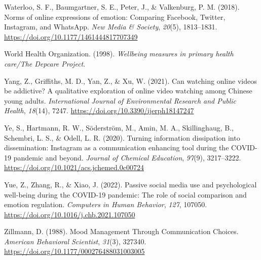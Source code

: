 \documentclass[
  man,mask]{apa7}
\newlength{\cslhangindent}
\newlength{\cslentryspacingunit} %
\newenvironment{CSLReferences}[2] %
 {%
  \setlength{\parindent}{0pt}
  \ifodd #1
  \let\oldpar\par
  \def\par{\hangindent=\cslhangindent\oldpar}
  \fi
  \setlength{\parskip}{#2\cslentryspacingunit}
 }%
 {}
\begin{document}
\begin{CSLReferences}{1}{0}
\leavevmode{}%
Waterloo, S. F., Baumgartner, S. E., Peter, J., \& Valkenburg, P. M. (2018). Norms of online expressions of emotion: {Comparing Facebook}, {Twitter}, {Instagram}, and {WhatsApp}. \emph{New Media \& Society}, \emph{20}(5), 1813--1831. \url{https://doi.org/10.1177/1461444817707349}

\leavevmode{}%
World Health Organization. (1998). \emph{Wellbeing measures in primary health care/{The Depcare Project}}.

\leavevmode{}%
Yang, Z., Griffiths, M. D., Yan, Z., \& Xu, W. (2021). Can watching online videos be addictive? {A} qualitative exploration of online video watching among {Chinese} young adults. \emph{International Journal of Environmental Research and Public Health}, \emph{18}(14), 7247. \url{https://doi.org/10.3390/ijerph18147247}

\leavevmode{}%
Ye, S., Hartmann, R. W., Söderström, M., Amin, M. A., Skillinghaug, B., Schembri, L. S., \& Odell, L. R. (2020). Turning information dissipation into dissemination: {Instagram} as a communication enhancing tool during the {COVID-19} pandemic and beyond. \emph{Journal of Chemical Education}, \emph{97}(9), 3217--3222. \url{https://doi.org/10.1021/acs.jchemed.0c00724}

\leavevmode{}%
Yue, Z., Zhang, R., \& Xiao, J. (2022). Passive social media use and psychological well-being during the {COVID-19} pandemic: {The} role of social comparison and emotion regulation. \emph{Computers in Human Behavior}, \emph{127}, 107050. \url{https://doi.org/10.1016/j.chb.2021.107050}

\leavevmode{}%
Zillmann, D. (1988). Mood {Management Through Communication Choices}. \emph{American Behavioral Scientist}, \emph{31}(3), 327340. \url{https://doi.org/10.1177/000276488031003005}

\end{CSLReferences}

\newpage
\end{document}
